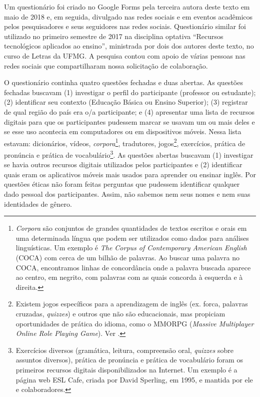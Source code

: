 \documentclass[portuguese]{textolivre}
\begin{document}
Um questionário foi criado no Google Forms pela terceira autora deste texto em maio de 2018 e, em seguida, divulgado nas redes sociais e em eventos acadêmicos pelos pesquisadores e seus seguidores nas redes sociais. Questionário similar foi utilizado no primeiro semestre de 2017 na disciplina optativa “Recursos tecnológicos aplicados ao ensino”, ministrada por dois dos autores deste texto, no curso de Letras da UFMG. A pesquisa contou com apoio de várias pessoas nas redes sociais que compartilharam nossa solicitação de colaboração.

 O questionário continha quatro questões fechadas e duas abertas. As questões fechadas buscavam (1) investigar o perfil do participante (professor ou estudante); (2) identificar seu contexto (Educação Básica ou Ensino Superior); (3) registrar de qual região do país era o/a participante; e (4) apresentar uma lista de recursos digitais para que os participantes pudessem marcar se usavam um ou mais deles e se esse uso acontecia em computadores ou em dispositivos móveis. Nessa lista estavam: dicionários, vídeos, \textit{corpora}\footnote{\textit{Corpora} são conjuntos de grandes quantidades de textos escritos e orais em uma determinada língua que podem ser utilizados como dados para análises linguísticas. Um exemplo é \textit{The Corpus of Contemporary American English} (COCA) com cerca de um bilhão de palavras. Ao buscar uma palavra no COCA, encontramos linhas de concordância onde a palavra buscada aparece ao centro, em negrito, com palavras com as quais concorda à esquerda e à direita.}, tradutores, jogos\footnote{Existem jogos específicos para a aprendizagem de inglês (ex. forca, palavras cruzadas, \textit{quizzes}) e outros que não são educacionais, mas propiciam oportunidades de prática do idioma, como o MMORPG (\textit{Massive Multiplayer Online Role Playing Game}). Ver \textcite{santos_os_2011}.}, exercícios, prática de pronúncia e prática de vocabulário\footnote{Exercícios diversos (gramática, leitura, compreensão oral, \textit{quizzes} sobre assuntos diversos), prática de pronúncia e prática de vocabulário foram os primeiros recursos digitais disponibilizados na Internet. Um exemplo é a página web ESL Cafe, criada por David Sperling, em 1995, e mantida por ele e colaboradores.}. As questões abertas buscavam (1) investigar se havia outros recursos digitais utilizados pelos participantes e (2) identificar quais eram os aplicativos móveis mais usados para aprender ou ensinar inglês. Por questões éticas não foram feitas perguntas que pudessem identificar qualquer dado pessoal dos participantes. Assim, não sabemos nem seus nomes e nem suas identidades de gênero.
 
\end{document}
